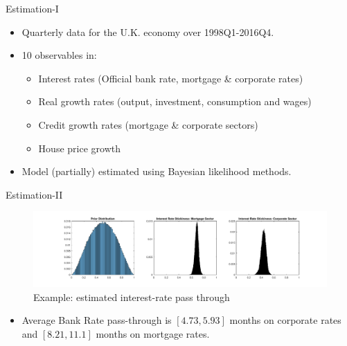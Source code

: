 \documentclass[8pt,aspectratio=169]{beamer}
\numberwithin{equation}{section}
\begin{document}
\begin{frame}{Estimation-I}


\begin{itemize}

\item Quarterly data for the U.K. economy over 1998Q1-2016Q4. 
\vspace{5 mm}
\item 10 observables in: 
\vspace{5 mm}
\begin{itemize}
\item Interest rates (Official bank rate, mortgage \& corporate rates)
\vspace{3 mm}
\item Real growth rates (output, investment, consumption and wages)
\vspace{3 mm}
\item Credit growth rates (mortgage \& corporate sectors) 
\vspace{3 mm}
\item House price growth
\end{itemize}

\vspace{5 mm}
\item Model (partially) estimated using Bayesian likelihood methods. 
\end{itemize}



\end{frame}





\begin{frame}{Estimation-II}

\begin{figure}[H]
\centering
\caption{{Example: estimated interest-rate pass through}}
\includegraphics[scale=0.4]{posteriordistributions_calvo2.pdf}
\end{figure}


\begin{itemize}
\item Average Bank Rate pass-through is $[4.73,5.93]$ months on corporate rates and $[8.21,11.1]$ months on mortgage rates.

\end{itemize}

\end{frame}
\end{document}
